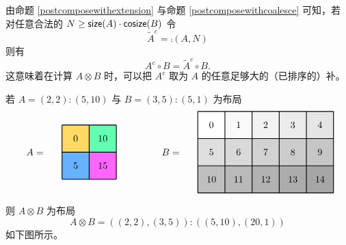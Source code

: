 \begin{observation}
    由命题 \ref{postcomposewithextension} 与命题 \ref{postcomposewithcoalesce} 可知，若对任意合法的 $N \geq \mathsf{size}(A) \cdot \mathsf{cosize}(B)$ 令
    \[
    \widetilde{A}^c = \comp(A,N)
    \]
    则有
    \[
    A^c \circ B = \tilde{A}^c \circ B.
    \]
    这意味着在计算 $A \otimes B$ 时，可以把 $A^c$ 取为 $A$ 的任意足够大的（已排序的）补。
\end{observation}

\begin{example}
    若 $A = (2,2):(5,10)$ 与 $B = (3,5):(5,1)$ 为布局
    \[
    \begin{tikzpicture}[x={(0cm,-1cm)},y={(1cm,0cm)},every node/.style={minimum size=1cm, outer sep=0pt}]

\node[fill=colorx2!60] at (0.5,0) {0};
\node[fill=colorx4!60] at (0.5,1) {10};
\node[fill=colorx6!60] at (1.5,0) {5};
\node[fill=colorx8!60] at (1.5,1) {15};
\draw[color=black,thick,shift={(0,-0.5)}] (0,0) grid (2,2);

\node[fill=gray!0] at (0,5) {0};
\node[fill=gray!5] at (0,6) {1};
\node[fill=gray!10] at (0,7) {2};
\node[fill=gray!15] at (0,8) {3};
\node[fill=gray!20] at (0,9) {4};
\node[fill=gray!25] at (1,5) {5};
\node[fill=gray!30] at (1,6) {6};
\node[fill=gray!35] at (1,7) {7};
\node[fill=gray!40] at (1,8) {8};
\node[fill=gray!45] at (1,9) {9};
\node[fill=gray!50] at (2,5) {10};
\node[fill=gray!55] at (2,6) {11};
\node[fill=gray!60] at (2,7) {12};
\node[fill=gray!65] at (2,8) {13};
\node[fill=gray!70] at (2,9) {14};
\draw[color=black,thick,shift={(-0.5,-0.5)}] (0,5) grid (3,10);

\node[anchor = east] at (1,-1) {$A = $ };
\node[anchor = east] at (1,4) {$B = $ };

\end{tikzpicture}
    \]
    则 $A \otimes B$ 为布局
    \[
    A \otimes B = ((2,2),(3,5)):((5,10),(20,1))
    \]
如下图所示。


\end{example}
